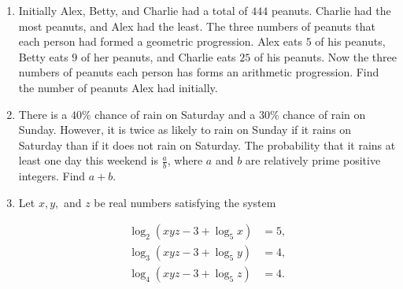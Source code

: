\documentclass{article}
\begin{document}
\begin{enumerate}[label=\arabic*., itemsep=0.5em]
\item Initially Alex, Betty, and Charlie had a total of \(444\) peanuts. Charlie had the most peanuts, and Alex had the least. The three numbers of peanuts that each person had formed a geometric progression. Alex eats \(5\) of his peanuts, Betty eats \(9\) of her peanuts, and Charlie eats \(25\) of his peanuts. Now the three numbers of peanuts each person has forms an arithmetic progression. Find the number of peanuts Alex had initially.\par \vspace{0.5em}\item There is a \(40\%\) chance of rain on Saturday and a \(30\%\) chance of rain on Sunday. However, it is twice as likely to rain on Sunday if it rains on Saturday than if it does not rain on Saturday. The probability that it rains at least one day this weekend is \(\frac{a}{b}\), where \(a\) and \(b\) are relatively prime positive integers. Find \(a+b\).\par \vspace{0.5em}\item Let \(x,y,\) and \(z\) be real numbers satisfying the system

\begin{align*}
\log_2(xyz-3+\log_5 x)&=5,\\
\log_3(xyz-3+\log_5 y)&=4,\\
\log_4(xyz-3+\log_5 z)&=4.
\end{align*}


\end{enumerate}
\end{document}
